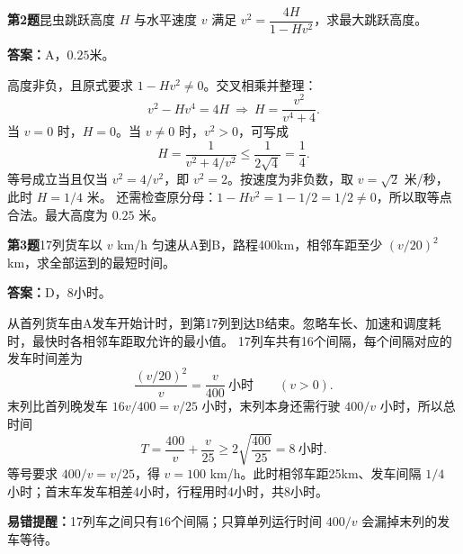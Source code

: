 \documentclass[UTF8,a4paper,11pt]{ctexart}
\newcommand{\q}[3]{\par\Needspace{7\baselineskip}\textbf{\color{accent}第#1题}\quad #2\par\textbf{答案：}#3\par}
\newcommand{\tip}[1]{\par{\small\textbf{易错提醒：}#1}\par}
\begin{document}
\q{2}{昆虫跳跃高度 $H$ 与水平速度 $v$ 满足 $v^2=\dfrac{4H}{1-Hv^2}$，求最大跳跃高度。}{A，$0.25$米。}
高度非负，且原式要求 $1-Hv^2\ne0$。交叉相乘并整理：
\[
v^2-Hv^4=4H\ \Longrightarrow\ H=\frac{v^2}{v^4+4}.
\]
当 $v=0$ 时，$H=0$。当 $v\ne0$ 时，$v^2>0$，可写成
\[
H=\frac1{v^2+4/v^2}\le\frac1{2\sqrt4}=\frac14.
\]
等号成立当且仅当 $v^2=4/v^2$，即 $v^2=2$。按速度为非负数，取 $v=\sqrt2$ 米/秒，此时 $H=1/4$ 米。
还需检查原分母：$1-Hv^2=1-1/2=1/2\ne0$，所以取等点合法。最大高度为 $0.25$ 米。

\q{3}{17列货车以 $v$ km/h 匀速从A到B，路程400km，相邻车距至少 $(v/20)^2$ km，求全部运到的最短时间。}{D，$8$小时。}
从首列货车由A发车开始计时，到第17列到达B结束。忽略车长、加速和调度耗时，最快时各相邻车距取允许的最小值。
17列车共有16个间隔，每个间隔对应的发车时间差为
\[
\frac{(v/20)^2}{v}=\frac v{400}\ \text{小时}\qquad(v>0).
\]
末列比首列晚发车 $16v/400=v/25$ 小时，末列本身还需行驶 $400/v$ 小时，所以总时间
\[
T=\frac{400}{v}+\frac v{25}\ge2\sqrt{\frac{400}{25}}=8\ \text{小时}.
\]
等号要求 $400/v=v/25$，得 $v=100$ km/h。此时相邻车距25km、发车间隔 $1/4$ 小时；首末车发车相差4小时，行程用时4小时，共8小时。
\tip{17列车之间只有16个间隔；只算单列运行时间 $400/v$ 会漏掉末列的发车等待。}
\end{document}
